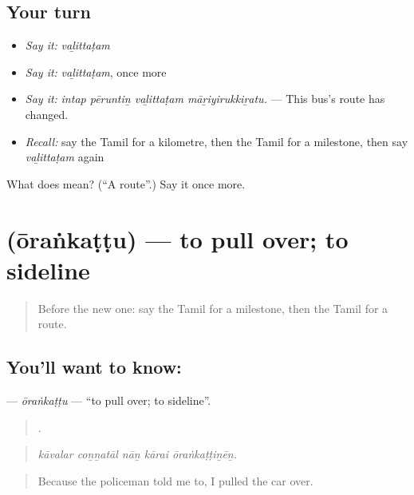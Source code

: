 \subsection*{Your turn}
\begin{itemize}
\raggedright
  \item \emph{Say it:} \emph{vaḻittaṭam}
  \item \emph{Say it:} \emph{vaḻittaṭam}, once more
  \item \emph{Say it:} \emph{intap pēruntiṉ vaḻittaṭam māṟiyirukkiṟatu.} — This bus's route has changed.
  \item \emph{Recall:} say the Tamil for a kilometre, then the Tamil for a milestone, then say \emph{vaḻittaṭam} again
\end{itemize}

\begin{tcolorbox}[breakable,colback=teal!4,colframe=teal!35!black,title={Before you move on}]
What does  mean? (\textquotedblleft{}A route\textquotedblright{}.) Say it once more.
\end{tcolorbox}
\section[\texorpdfstring{\ta{ஓரங்கட்டு} (ōraṅkaṭṭu)}{ஓரங்கட்டு (ōraṅkaṭṭu)}]{ (ōraṅkaṭṭu) — to pull over; to sideline}

\label{lesson:TA-C407-orankattu}



\begin{quote}
Before the new one: say the Tamil for a milestone, then the Tamil for a route.
\end{quote}

\subsection*{You'll want to know: }
\textbf{} — \emph{ōraṅkaṭṭu} — \textquotedblleft{}to pull over; to sideline\textquotedblright{}.

\begin{quote}
    .
\end{quote}

\begin{quote}
\emph{kāvalar coṉṉatāl nāṉ kārai ōraṅkaṭṭiṉēṉ.}
\end{quote}

\begin{quote}
Because the policeman told me to, I pulled the car over.
\end{quote}

